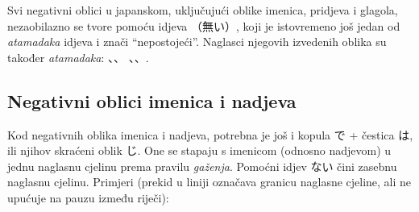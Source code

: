Svi negativni oblici u japanskom, uključujući oblike imenica, pridjeva i glagola, nezaobilazno se tvore pomoću idjeva （無い）, koji je istovremeno još jedan od \textit{atamadaka} idjeva i znači ``nepostojeći''.
Naglasci njegovih izvedenih oblika su također \textit{atamadaka}: 、、 、、.

\subsection{Negativni oblici imenica i nadjeva}
Kod negativnih oblika imenica i nadjeva, potrebna je još i kopula で + čestica は, ili njihov skraćeni oblik じ. One se stapaju s imenicom (odnosno nadjevom) u jednu naglasnu cjelinu prema pravilu \textit{gaženja}.
Pomoćni idjev ない čini zasebnu naglasnu cjelinu.
Primjeri (prekid u liniji označava granicu naglasne cjeline, ali ne upućuje na pauzu između riječi):
